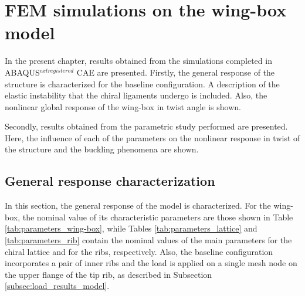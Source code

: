 \chapter{FEM simulations on the wing-box model} \label{chap:results_sim}
  
  In the present chapter, results obtained from the simulations completed in ABAQUS$^{	extregistered}$ CAE are presented. Firstly, the general response of the structure is characterized for the baseline configuration. A description of the elastic instability that the chiral ligaments undergo is included. Also, the nonlinear global response of the wing-box in twist angle is shown.

  Secondly, results obtained from the parametric study performed are presented. Here, the influence of each of the parameters on the nonlinear response in twist of the structure and the buckling phenomena are shown.

\section{General response characterization} \label{sec:generalResponseCharact_results_sim}

  In this section, the general response of the model is characterized. For the wing-box, the nominal value of its characteristic parameters are those shown in Table \ref{tab:parameters_wing-box}, while Tables \ref{tab:parameters_lattice} and \ref{tab:parameters_rib} contain the nominal values of the main parameters for the chiral lattice and for the ribs, respectively. Also, the baseline configuration incorporates a pair of inner ribs and the load is applied on a single mesh node on the upper flange of the tip rib, as described in Subsection \ref{subsec:load_results_model}.

